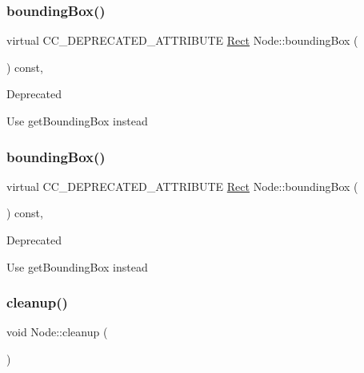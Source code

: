 \subsubsection{\texorpdfstring{bounding\+Box()}{boundingBox()}\hspace{0.1cm}{\footnotesize\ttfamily [1/2]}}
{\footnotesize\ttfamily virtual C\+C\+\_\+\+D\+E\+P\+R\+E\+C\+A\+T\+E\+D\+\_\+\+A\+T\+T\+R\+I\+B\+U\+TE \hyperlink{classRect}{Rect} Node\+::bounding\+Box (\begin{DoxyParamCaption}{ }\end{DoxyParamCaption}) const\hspace{0.3cm}{\ttfamily [inline]}, {\ttfamily [virtual]}}

\begin{DoxyRefDesc}{Deprecated}
\item[\hyperlink{deprecated__deprecated000031}{Deprecated}]Use get\+Bounding\+Box instead \end{DoxyRefDesc}
\mbox{\label{classNode_a7744d16609dfc7609e889129b8672afb}} 
\subsubsection{\texorpdfstring{bounding\+Box()}{boundingBox()}\hspace{0.1cm}{\footnotesize\ttfamily [2/2]}}
{\footnotesize\ttfamily virtual C\+C\+\_\+\+D\+E\+P\+R\+E\+C\+A\+T\+E\+D\+\_\+\+A\+T\+T\+R\+I\+B\+U\+TE \hyperlink{classRect}{Rect} Node\+::bounding\+Box (\begin{DoxyParamCaption}{ }\end{DoxyParamCaption}) const\hspace{0.3cm}{\ttfamily [inline]}, {\ttfamily [virtual]}}

\begin{DoxyRefDesc}{Deprecated}
\item[\hyperlink{deprecated__deprecated000261}{Deprecated}]Use get\+Bounding\+Box instead \end{DoxyRefDesc}
\mbox{\label{classNode_aa2de84c6cdeec9cd647d236c30ee0567}} 
\subsubsection{\texorpdfstring{cleanup()}{cleanup()}\hspace{0.1cm}{\footnotesize\ttfamily [1/2]}}
{\footnotesize\ttfamily void Node\+::cleanup (\begin{DoxyParamCaption}{ }\end{DoxyParamCaption})\hspace{0.3cm}{\ttfamily [virtual]}}

